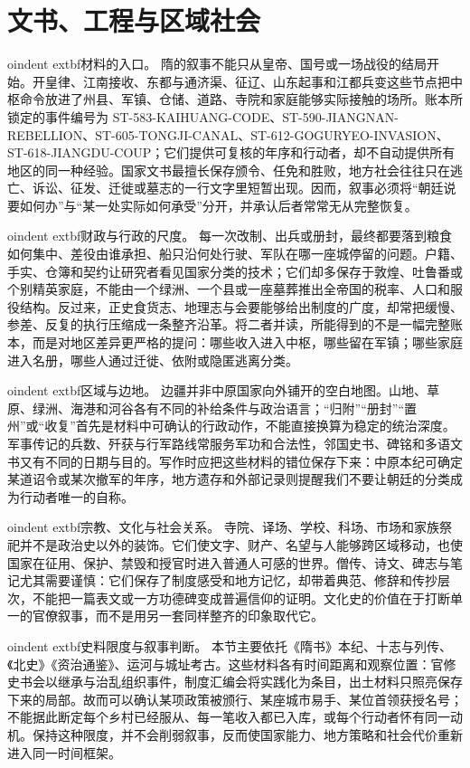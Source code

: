 \section{文书、工程与区域社会}
\label{sec:sui-documentary-regional-society}

oindent	extbf{材料的入口。} 隋的叙事不能只从皇帝、国号或一场战役的结局开始。开皇律、江南接收、东都与通济渠、征辽、山东起事和江都兵变这些节点把中枢命令放进了州县、军镇、仓储、道路、寺院和家庭能够实际接触的场所。账本所锁定的事件编号为 ST-583-KAIHUANG-CODE、ST-590-JIANGNAN-REBELLION、ST-605-TONGJI-CANAL、ST-612-GOGURYEO-INVASION、ST-618-JIANGDU-COUP；它们提供可复核的年序和行动者，却不自动提供所有地区的同一种经验。国家文书最擅长保存颁令、任免和胜败，地方社会往往只在逃亡、诉讼、征发、迁徙或墓志的一行文字里短暂出现。因而，叙事必须将“朝廷说要如何办”与“某一处实际如何承受”分开，并承认后者常常无从完整恢复。


oindent	extbf{财政与行政的尺度。} 每一次改制、出兵或册封，最终都要落到粮食如何集中、差役由谁承担、船只沿何处行驶、军队在哪一座城停留的问题。户籍、手实、仓簿和契约让研究者看见国家分类的技术；它们却多保存于敦煌、吐鲁番或个别精英家庭，不能由一个绿洲、一个县或一座墓葬推出全帝国的税率、人口和服役结构。反过来，正史食货志、地理志与会要能够给出制度的广度，却常把缓慢、参差、反复的执行压缩成一条整齐沿革。将二者并读，所能得到的不是一幅完整账本，而是对地区差异更严格的提问：哪些收入进入中枢，哪些留在军镇；哪些家庭进入名册，哪些人通过迁徙、依附或隐匿逃离分类。


oindent	extbf{区域与边地。} 边疆并非中原国家向外铺开的空白地图。山地、草原、绿洲、海港和河谷各有不同的补给条件与政治语言；“归附”“册封”“置州”或“收复”首先是材料中可确认的行政动作，不能直接换算为稳定的统治深度。军事传记的兵数、歼获与行军路线常服务军功和合法性，邻国史书、碑铭和多语文书又有不同的日期与目的。写作时应把这些材料的错位保存下来：中原本纪可确定某道诏令或某次撤军的年序，地方遗存和外部记录则提醒我们不要让朝廷的分类成为行动者唯一的自称。


oindent	extbf{宗教、文化与社会关系。} 寺院、译场、学校、科场、市场和家族祭祀并不是政治史以外的装饰。它们使文字、财产、名望与人能够跨区域移动，也使国家在征用、保护、禁毁和授官时进入普通人可感的世界。僧传、诗文、碑志与笔记尤其需要谨慎：它们保存了制度感受和地方记忆，却带着典范、修辞和传抄层次，不能把一篇表文或一方功德碑变成普遍信仰的证明。文化史的价值在于打断单一的官僚叙事，而不是用另一套同样整齐的印象取代它。


oindent	extbf{史料限度与叙事判断。} 本节主要依托《隋书》本纪、十志与列传、《北史》《资治通鉴》、运河与城址考古。这些材料各有时间距离和观察位置：官修史书会以继承与治乱组织事件，制度汇编会将实践化为条目，出土材料只照亮保存下来的局部。故而可以确认某项政策被颁行、某座城市易手、某位首领获授名号；不能据此断定每个乡村已经服从、每一笔收入都已入库，或每个行动者怀有同一动机。保持这种限度，并不会削弱叙事，反而使国家能力、地方策略和社会代价重新进入同一时间框架。

